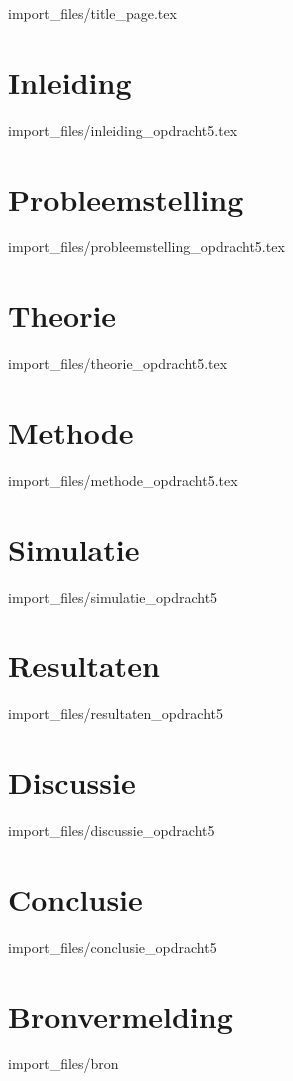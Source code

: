 \documentclass{article}
\begin{document}
{import_files/title_page.tex}

\tableofcontents
\clearpage

\section{Inleiding}

{import_files/inleiding_opdracht5.tex}

\section{Probleemstelling}

{import_files/probleemstelling_opdracht5.tex}

\section{Theorie}

{import_files/theorie_opdracht5.tex}

\section{Methode}

{import_files/methode_opdracht5.tex}

\section{Simulatie}
 
{import_files/simulatie_opdracht5}

\section{Resultaten}

{import_files/resultaten_opdracht5}

\section{Discussie}

{import_files/discussie_opdracht5}

\section{Conclusie}

{import_files/conclusie_opdracht5}

\section{Bronvermelding}

{import_files/bron}


\end{document}
